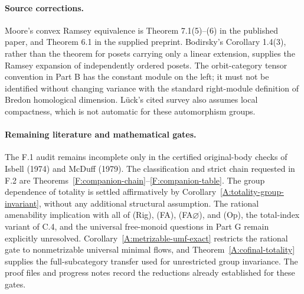 \paragraph{Source corrections.}
Moore's convex Ramsey equivalence is Theorem 7.1(5)--(6) in the
published paper, and Theorem 6.1 in the supplied preprint. Bodirsky's
Corollary 1.4(3), rather than the theorem for posets carrying only a
linear extension, supplies the Ramsey expansion of independently
ordered posets. The orbit-category tensor convention in Part B has
the constant module on the left; it must not be identified without
changing variance with the standard right-module definition of Bredon
homological dimension. L\"uck's cited survey also assumes local
compactness, which is not automatic for these automorphism groups.



\paragraph{Remaining literature and mathematical gates.}
The F.1 audit remains incomplete only in the certified original-body
checks of Isbell (1974) and McDuff (1979). The classification and strict chain requested in F.2 are
Theorems~\ref{F:companion-chain}--\ref{F:companion-table}.
The group dependence of totality is settled affirmatively by
Corollary~\ref{A:totality-group-invariant}, without any additional
structural assumption. The rational amenability
implication with all of (Rig), (FA), (FA$\varnothing$), and (Op), the total-index
variant of C.4, and the universal free-monoid questions in Part G
remain explicitly unresolved. Corollary~\ref{A:metrizable-umf-exact}
restricts the rational gate to nonmetrizable universal minimal flows,
and Theorem~\ref{A:cofinal-totality} supplies the full-subcategory
transfer used for unrestricted group invariance. The proof files and progress notes
record the reductions already established for these gates.
